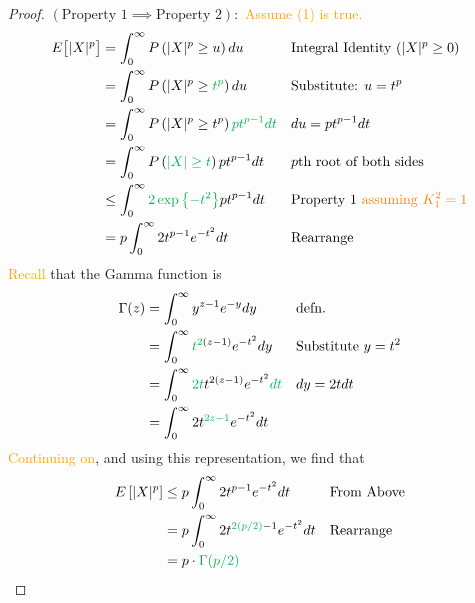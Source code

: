 \begin{proof}
    $(\text{Property }1 \implies \text{Property }2): $ \textcolor{orange}{Assume (1) is true.} 
    \begin{align*}
    E\big[|X|^p\big] &= \int_{0}^{\infty} P\left(|X|^p \geq u\right)du && 
        \text{Integral Identity $\left(|X|^p \geq 0\right)$} \\ 
    &= \int_{0}^{\infty} \Prob{|X|^p \geq \textcolor{\darkgreen}{t^p} }du &&
        \text{Substitute: $u = t^p$} \\ 
    &= \int_{0}^{\infty} \Prob{ |X|^p \geq t^p }\textcolor{\darkgreen}{pt^{p-1}dt} && 
        \text{$du = pt^{p-1}dt$} \\ 
    &= \int_{0}^{\infty} \Prob{ \textcolor{\darkgreen}{|X| \geq t }}pt^{p-1}dt && 
        \text{$p$th root of both sides} \\ 
    &\leq \int_{0}^{\infty} \textcolor{\darkgreen}{2\exponential{-t^2}}pt^{p-1}dt &&
        \text{Property 1 \textcolor{orange}{assuming $K_1^2=1$}}  \\
    &= p \int_{0}^{\infty} 2t^{p-1} e^{-t^2} dt &&
        \text{Rearrange} \\ 
    \end{align*}
    \textcolor{orange}{Recall} that the Gamma function is 
    \begin{align*}
        \Gamma(z) &= \int_{0}^{\infty} y^{z-1}e^{-y}dy 
            &&\text{defn. } \\ 
        &= \int_{0}^{\infty} \textcolor{\darkgreen}{t}^
            {\textcolor{\darkgreen}{2}(z-1)}e^{-t^2} dy
            &&\text{Substitute $y = t^2$} \\
        &= \int_{0}^{\infty} \textcolor{\darkgreen}{2t} t^{2(z-1)}e^{-t^2} \textcolor{\darkgreen}{dt}
            &&\text{$dy = 2tdt$} \\ 
        &= \int_{0}^{\infty} 2 t^{\textcolor{\darkgreen}{2z - 1}}e^{-t^2} dt
            &&\text{} \\ 
    \end{align*}
    \textcolor{orange}{Continuing on}, and using this representation, we find that 
    \begin{align*}
        \Expect{|X|^p} &\leq p \int_{0}^{\infty} 2t^{p-1} e^{-t^2} dt &&
            \text{From Above} \\ 
        &= p \int_{0}^{\infty} 2t^{\textcolor{\darkgreen}{2(p/2)}-1} e^{-t^2} dt &&
            \text{Rearrange} \\ 
        &= p \cdot \textcolor{\darkgreen}{\Gamma(p/2)} && 

\end{align*}
\end{proof}

